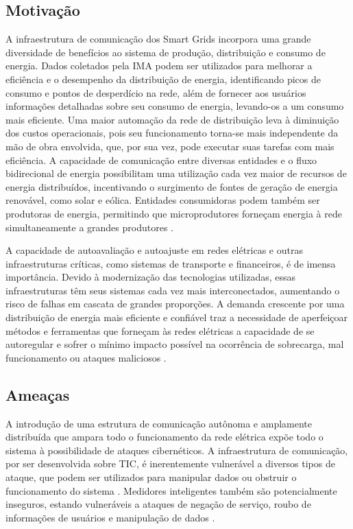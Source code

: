 \documentclass[cic,tc]{iiufrgs}
\begin{document}
\subsection{Motivação}

A  infraestrutura de comunicação dos Smart Grids incorpora uma grande diversidade de benefícios ao sistema de produção, distribuição e consumo de energia. Dados coletados pela IMA podem ser utilizados para melhorar a eficiência e o desempenho da distribuição de energia, identificando picos de consumo e pontos de desperdício na rede, além de fornecer aos usuários informações detalhadas sobre seu consumo de energia, levando-os a um consumo mais eficiente. Uma maior automação da rede de distribuição leva à diminuição dos custos operacionais, pois seu funcionamento torna-se mais independente da mão de obra envolvida, que, por sua vez, pode executar suas tarefas com mais eficiência. A capacidade de comunicação entre diversas entidades e o fluxo bidirecional de energia possibilitam uma utilização cada vez maior de recursos de energia distribuídos, incentivando o surgimento de fontes de geração de energia renovável, como solar e eólica. Entidades consumidoras podem também ser produtoras de energia, permitindo que microprodutores forneçam energia à rede simultaneamente a grandes produtores \cite{2013survey}.

A capacidade de autoavaliação e autoajuste em redes elétricas e outras infraestruturas críticas, como sistemas de transporte e financeiros, é de imensa importância. Devido à modernização das tecnologias utilizadas, essas infraestruturas têm seus sistemas cada vez mais interconectados, aumentando o risco de falhas em cascata de grandes proporções. A demanda crescente por uma distribuição de energia mais eficiente e confiável traz a necessidade de aperfeiçoar métodos e ferramentas que forneçam às redes elétricas a capacidade de se autoregular e sofrer o mínimo impacto possível na ocorrência de sobrecarga, mal funcionamento ou ataques maliciosos \cite{massoud2005toward}.

\subsection{Ameaças}

A introdução de uma estrutura de comunicação autônoma e amplamente distribuída que ampara todo o funcionamento da rede elétrica expõe todo o sistema à possibilidade de ataques cibernéticos. A infraestrutura de comunicação, por ser desenvolvida sobre TIC, é inerentemente vulnerável a diversos tipos de ataque, que podem ser utilizados para manipular dados ou obstruir o funcionamento do sistema \cite{pin2012smart}. Medidores inteligentes também são potencialmente inseguros, estando vulneráveis a ataques de negação de serviço, roubo de informações de usuários e manipulação de dados \cite{ashford2011smartmeter}.
\end{document}
